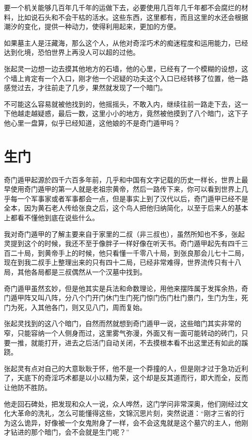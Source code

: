 要一个机关能够几百年几千年的运做下去，必要使用几百年几千年都不会腐烂的材料，比如说石头和不会干枯的活水。这些东西，这里都有，而且这里的水还会根据潮汐的变化，提供一种动力，使得利用起来，更加的方便。

如果墓主人是汪藏海，那么这个人，从他对奇淫巧术的痴迷程度和运用能力，已经达到化境，恐怕世界上再没人可以超的过他。

张起灵一边想一边去摸其他地方的石墙，他的心里，已经有了一个模糊的设想，这个墙上肯定有一个入口，刚才他一个迟疑的功夫这个入口已经转移了位置，他一路感觉过去，才往前走了几步，果然就发现了一个暗门。

不可能这么容易就被他找到的，他摇摇头，不敢入内，继续往前一路走下去，这一下他越走越疑惑，最后一数，这里小小的地方，竟然被他摸到了八个暗门，这下子他心里一盘算，似乎已经知道，这他娘的不是奇门遁甲吗？

\chapter{生门}

奇门遁甲起源於四千六百多年前，几乎和中国有文字记载的历史一样长，世界上最早使用奇门遁甲的第一人就是老祖宗黄帝，然后一路传下来，你可以看到世界上几乎每一个军事家或者军事都会一点，但是事实上到了汉代以后，奇门遁甲已经不是全本，因为黄石老人传给张良之后，这个鸟人把他归纳简化，以至于后来人的基本上都看不懂他到底在说些什么。

我对奇门遁甲的了解主要来自于家里的二叔（非三叔也），虽然所知也不多，张起灵提到这个的时候，我还不至于像胖子一样好像在听天书。奇门遁甲起先有四千三百二十局，到黄帝手上的时候，他只看懂一千零八十局，到张良那会儿七十二局，现在到我二叔手上整理出来的只有四十二局，已经非常难得，世界流传只有十八局，其他各局都是三叔偶然从一个汉墓中找到。

奇门遁甲虽然玄妙，但是他其实是兵法和命数理论，用他来摆阵属于发挥余热，奇门遁甲阵又叫八阵，分八个门开门休门生门死门惊门伤门杜门景门，生门为生，死门为死，入其他各门，则又见八门，周而复始。

张起灵找到的这八个暗门，自然而然就想到奇门遁甲一说，这些暗门其实非常的窄，只能容纳一个人侧身而过，这里雾气弥漫，外面又有一面可能转动的砖门，只要一推，就能打开，进去之后活门自动关闭，不去摸根本看不出这里还有如此的蹊跷。

张起灵有点对自己的大意耿耿于怀，他不是一个莽撞的人，但是刚才过于急功近利了，天底下的奇淫巧术都是以小以精为荣，这个却是反其道而行，即大而全，反而让他防不胜防。

他走回石碑处，把发现和众人一说，众人哗然，这门学问非常深奥，他们刚经过文化大革命的洗礼，怎么可能懂得这些，文锦沉思片刻，突然说道：“刚才三省的行为这么诡异，好像被一个女鬼附身了一样，会不会这鬼就是这个墓穴的主人，他刚才钻进的那个暗门，会不会就是生门呢？”

